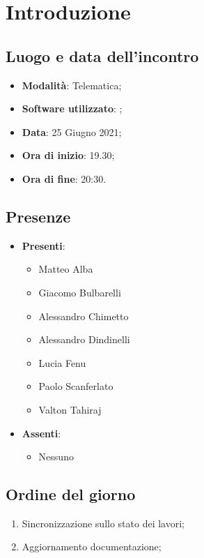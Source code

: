 \documentclass[]{article}
\begin{document}
	

	\newpage


		\section{Introduzione}
		\subsection{Luogo e data dell'incontro}
		\begin{itemize}
			\item \textbf{Modalità}: Telematica;
			\item \textbf{Software utilizzato}: ;
			\item \textbf{Data}: 25 Giugno 2021;
			\item \textbf{Ora di inizio}: 19.30;
			\item \textbf{Ora di fine}: 20:30.
		\end{itemize}

		\subsection{Presenze}
		\begin{itemize}
			\item \textbf{Presenti}:
			\begin{itemize}
				\item Matteo Alba
				\item Giacomo Bulbarelli
				\item Alessandro Chimetto
				\item Alessandro Dindinelli
				\item Lucia Fenu
				\item Paolo Scanferlato
				\item Valton Tahiraj
			\end{itemize}
			\item \textbf{Assenti}:
			\begin{itemize}
				\item Nessuno
			\end{itemize}
		\end{itemize}


		\subsection{Ordine del giorno}
		\begin{enumerate}
			\item Sincronizzazione sullo stato dei lavori;
			\item Aggiornamento documentazione;
		\end{enumerate}
\end{document}

